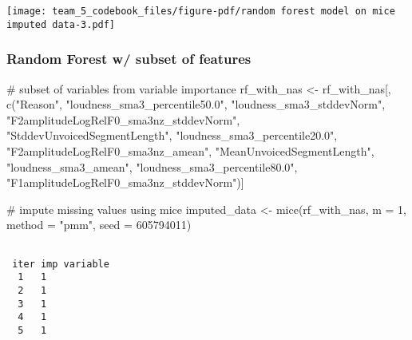 \documentclass[
  letterpaper,
  DIV=11,
  numbers=noendperiod]{scrartcl}
\newenvironment{Shaded}{\begin{snugshade}}{\end{snugshade}}
\newcommand{\AttributeTok}[1]{\textcolor[rgb]{0.40,0.45,0.13}{#1}}
\newcommand{\CommentTok}[1]{\textcolor[rgb]{0.37,0.37,0.37}{#1}}
\newcommand{\DecValTok}[1]{\textcolor[rgb]{0.68,0.00,0.00}{#1}}
\newcommand{\FunctionTok}[1]{\textcolor[rgb]{0.28,0.35,0.67}{#1}}
\newcommand{\NormalTok}[1]{\textcolor[rgb]{0.00,0.23,0.31}{#1}}
\newcommand{\OtherTok}[1]{\textcolor[rgb]{0.00,0.23,0.31}{#1}}
\newcommand{\StringTok}[1]{\textcolor[rgb]{0.13,0.47,0.30}{#1}}
\begin{document}
\begin{center}
\texttt{[image: team\_5\_codebook\_files/figure-pdf/random forest model on mice imputed data-3.pdf]}
\end{center}

\subsubsection{Random Forest w/ subset of
features}\label{random-forest-w-subset-of-features}

\begin{Shaded}
\begin{Highlighting}[]
\CommentTok{\# subset of variables from variable importance}
\NormalTok{rf\_with\_nas }\OtherTok{\textless{}{-}}\NormalTok{ rf\_with\_nas[, }\FunctionTok{c}\NormalTok{(}\StringTok{"Reason"}\NormalTok{, }\StringTok{"loudness\_sma3\_percentile50.0"}\NormalTok{, }\StringTok{"loudness\_sma3\_stddevNorm"}\NormalTok{, }\StringTok{"F2amplitudeLogRelF0\_sma3nz\_stddevNorm"}\NormalTok{, }\StringTok{"StddevUnvoicedSegmentLength"}\NormalTok{, }\StringTok{"loudness\_sma3\_percentile20.0"}\NormalTok{, }\StringTok{"F2amplitudeLogRelF0\_sma3nz\_amean"}\NormalTok{, }\StringTok{"MeanUnvoicedSegmentLength"}\NormalTok{, }\StringTok{"loudness\_sma3\_amean"}\NormalTok{, }\StringTok{"loudness\_sma3\_percentile80.0"}\NormalTok{, }\StringTok{"F1amplitudeLogRelF0\_sma3nz\_stddevNorm"}\NormalTok{)]}

\CommentTok{\# impute missing values using mice}
\NormalTok{imputed\_data }\OtherTok{\textless{}{-}} \FunctionTok{mice}\NormalTok{(rf\_with\_nas, }\AttributeTok{m =} \DecValTok{1}\NormalTok{, }\AttributeTok{method =} \StringTok{"pmm"}\NormalTok{, }\AttributeTok{seed =} \DecValTok{605794011}\NormalTok{)}
\end{Highlighting}
\end{Shaded}

\begin{verbatim}

 iter imp variable
  1   1
  2   1
  3   1
  4   1
  5   1
\end{verbatim}
\end{document}
